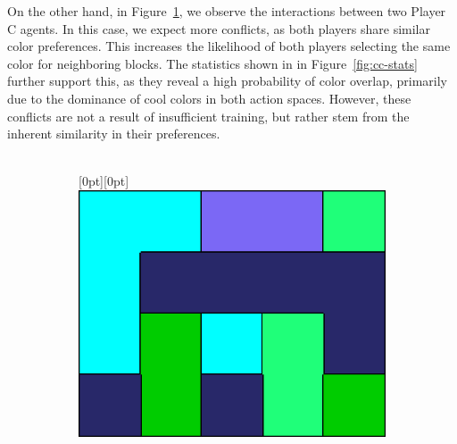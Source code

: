 \begin{flushleft}
\begin{flushleft}
        On the other hand, in Figure~\ref{fig:cc-solution}, we observe the interactions between two Player C agents. In this case, we expect more conflicts, as both players share similar color preferences. This increases the likelihood of both players selecting the same color for neighboring blocks. The statistics shown in in Figure~\ref{fig:cc-stats} further support this, as they reveal a high probability of color overlap, primarily due to the dominance of cool colors in both action spaces. However, these conflicts are not a result of insufficient training, but rather stem from the inherent similarity in their preferences.\\~\\
        \begin{figure}[H]
            \centering
            \begin{subfigure}[b]{0.45\textwidth}
                \centering
                \vspace{0.5em}
                \raisebox{0.8cm}[0pt][0pt]{\includegraphics[width=\textwidth]{images/cc-solution.png}}
                \caption{}
                \label{fig:cc-solution}
            \end{subfigure}
            \hspace{0.05\textwidth}
            \begin{subfigure}[b]{0.45\textwidth}
                \centering

\end{subfigure}
\end{figure}
\end{flushleft}
\end{flushleft}

